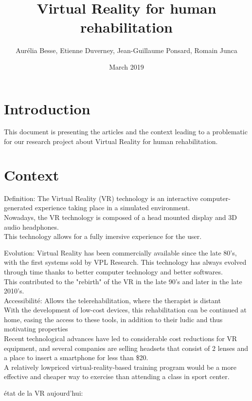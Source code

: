 \documentclass{article}
\title{Virtual Reality for human rehabilitation}
\author{ Aurélia Besse, Etienne Duverney, Jean-Guillaume Ponsard, Romain Junca }
\date{March 2019}
\begin{document}
\maketitle

\section{Introduction}

This document is presenting the articles and the context leading to a problematic for our research project about Virtual Reality for human rehabilitation.


\section{Context}

Definition:
The Virtual Reality (VR) technology is an interactive computer-generated experience taking place in a simulated environment. 
\\
Nowadays, the VR technology is composed of a head mounted display and 3D audio headphones.
\\
This technology allows for a fully imersive experience for the user.

Evolution:
Virtual Reality has been commercially available since the late 80's, with the first systems sold by VPL Research.
This technology has always evolved through time thanks to better computer technology and better softwares.
\\
This contributed to the "rebirth" of the VR in the late 90's and later in the late 2010's.
\\



Accessibilité:
Allows the telerehabilitation, where the therapist is distant 
\\ With the development of low-cost devices, this rehabilitation can be continued at home, easing the access to these tools, in addition to their ludic and thus motivating properties
\\ Recent technological advances have led to considerable cost reductions for VR equipment, and several companies are selling headsets that consist of 2 lenses and a place to insert a smartphone for less than \$20.
\\ A relatively lowpriced virtual-reality-based training program would be a more effective and cheaper way to exercise than attending a class in sport center.

état de la VR aujourd'hui: \\
\end{document}
